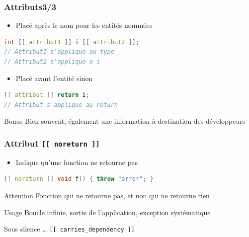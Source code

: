 \documentclass[C++.tex]{subfiles}
\begin{document}
\begin{frame}[fragile]
	\frametitle{Attributs\titlehfill{}3/3}
	\begin{itemize}
		\item Placé après le nom pour les entités nommées
	\end{itemize}

	\begin{lstlisting}[language=C++]
int [[ attribut1 ]] i [[ attribut2 ]];
// Attribut1 s'applique au type
// Attribut2 s'applique a i\end{lstlisting}

	\begin{itemize}
		\item Placé avant l'entité sinon
	\end{itemize}

	\begin{lstlisting}[language=C++]
[[ attribut ]] return i;
// Attribut s'applique au return\end{lstlisting}

	\begin{exampleblock}{Bonus}
		Bien souvent, également une information à destination des développeurs
	\end{exampleblock}
\end{frame}

\begin{frame}[fragile]
	\frametitle{Attribut \lstinline|[[ noreturn ]]|}
	\begin{itemize}
		\item Indique qu'une fonction ne retourne pas
	\end{itemize}

	\begin{lstlisting}[language=C++]
[[ noreturn ]] void f() { throw "error"; }\end{lstlisting}

	\begin{alertblock}{Attention}
		Fonction qui ne retourne pas, et non qui ne retourne rien

	\end{alertblock}

	\begin{block}{Usage}
		Boucle infinie, sortie de l'application, exception systématique
	\end{block}

	\begin{block}{Sous silence \ldots}
		\lstinline|[[ carries_dependency ]]| 
	
	\end{block}
\end{frame}
\end{document}
